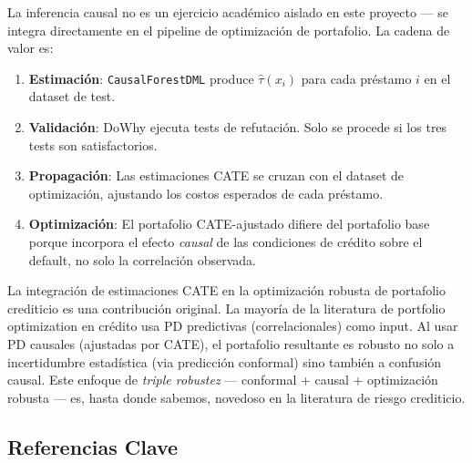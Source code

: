 \documentclass[
  spanish,
  11pt,
  letterpaper,
]{scrbook}
\providecommand{\tightlist}{%
  \setlength{\itemsep}{0pt}\setlength{\parskip}{0pt}}
\theoremstyle{plain}
\theoremstyle{remark}
\begin{document}
La inferencia causal no es un ejercicio académico aislado en este
proyecto --- se integra directamente en el pipeline de optimización de
portafolio. La cadena de valor es:

\begin{enumerate}
\def\labelenumi{\arabic{enumi}.}
\tightlist
\item
  \textbf{Estimación}: \texttt{CausalForestDML} produce
  \(\hat{\tau}(x_i)\) para cada préstamo \(i\) en el dataset de test.
\item
  \textbf{Validación}: DoWhy ejecuta tests de refutación. Solo se
  procede si los tres tests son satisfactorios.
\item
  \textbf{Propagación}: Las estimaciones CATE se cruzan con el dataset
  de optimización, ajustando los costos esperados de cada préstamo.
\item
  \textbf{Optimización}: El portafolio CATE-ajustado difiere del
  portafolio base porque incorpora el efecto \emph{causal} de las
  condiciones de crédito sobre el default, no solo la correlación
  observada.
\end{enumerate}

\begin{tcolorbox}[enhanced jigsaw, arc=.35mm, bottomrule=.15mm, bottomtitle=1mm, breakable, colback=white, colbacktitle=quarto-callout-tip-color!10!white, colframe=quarto-callout-tip-color-frame, coltitle=black, left=2mm, leftrule=.75mm, opacityback=0, opacitybacktitle=0.6, rightrule=.15mm, title=\textcolor{quarto-callout-tip-color}{\faLightbulb}\hspace{0.5em}{Contribución del proyecto}, titlerule=0mm, toprule=.15mm, toptitle=1mm]

La integración de estimaciones CATE en la optimización robusta de
portafolio crediticio es una contribución original. La mayoría de la
literatura de portfolio optimization en crédito usa PD predictivas
(correlacionales) como input. Al usar PD causales (ajustadas por CATE),
el portafolio resultante es robusto no solo a incertidumbre estadística
(via predicción conformal) sino también a confusión causal. Este enfoque
de \emph{triple robustez} --- conformal + causal + optimización robusta
--- es, hasta donde sabemos, novedoso en la literatura de riesgo
crediticio.

\end{tcolorbox}

\subsection{Referencias Clave}\label{sec-causal-references}
\end{document}
